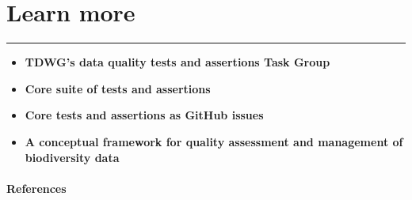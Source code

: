 \documentclass[]{book}
\theoremstyle{definition}
\theoremstyle{definition}
\theoremstyle{definition}
\theoremstyle{remark}
\begin{document}
\hypertarget{learn-more}{\chapter{Learn more}\label{learn-more}}

\begin{center}\rule{0.5\linewidth}{\linethickness}\end{center}

\begin{itemize}
\item
  \textbf{TDWG's data quality tests and assertions Task Group}
\item
  \textbf{Core suite of tests and assertions}
\item
  \textbf{Core tests and assertions as GitHub issues}
\item
  \textbf{A conceptual framework for quality assessment and management
  of biodiversity data \citep{Veiga2017} }
\end{itemize}

\subsubsection*{References}\label{references-1}


\end{document}
